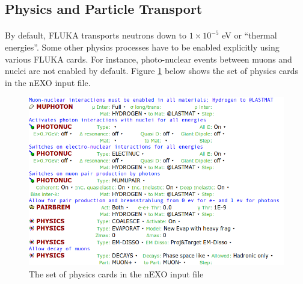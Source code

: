 \subsection{Physics and Particle Transport}

\paragraph{}
By default, FLUKA transports neutrons down to $1 \times 10^{-5}$ eV or ``thermal energies''. Some other physics processes have to be enabled explicitly using various FLUKA cards. For instance, photo-nuclear events between muons and nuclei are not enabled by default. Figure \ref{fig:physics1} below shows the set of physics cards in the nEXO input file.

\begin{figure}[h]
    \begin{center}
    \includegraphics[scale=0.5]{figures/physics.png}
    \caption{The set of physics cards in the nEXO input file}
    \label{fig:physics1}
    \end{center}
\end{figure}